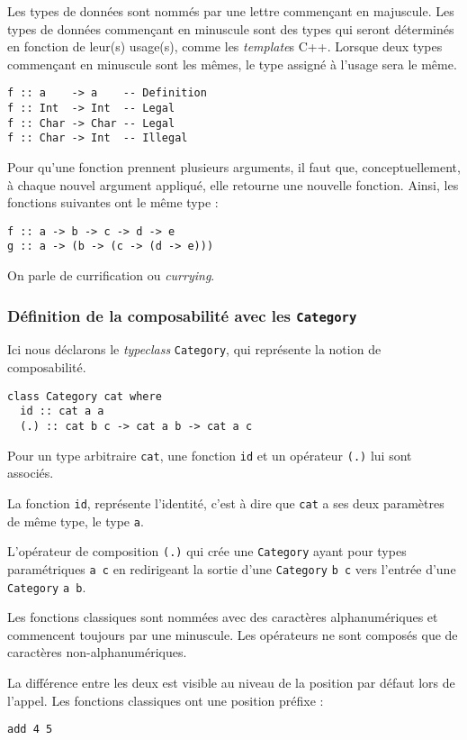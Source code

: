 \documentclass{llncs}
\begin{document}
Les types de données sont nommés par une lettre commençant en majuscule.
Les types de données commençant en minuscule sont des types qui seront déterminés
en fonction de leur(s) usage(s), comme les \emph{template}s C++.
Lorsque deux types commençant en minuscule sont les mêmes, le type assigné à
l'usage sera le même.
\begin{lstlisting}
f :: a    -> a    -- Definition
f :: Int  -> Int  -- Legal
f :: Char -> Char -- Legal
f :: Char -> Int  -- Illegal
\end{lstlisting}

Pour qu'une fonction prennent plusieurs arguments, il faut que, conceptuellement,
à chaque nouvel argument appliqué, elle retourne une nouvelle fonction.
Ainsi, les fonctions suivantes ont le même type :
\begin{lstlisting}
f :: a -> b -> c -> d -> e
g :: a -> (b -> (c -> (d -> e)))
\end{lstlisting}
On parle de currification ou \emph{currying}.

\subsubsection{Définition de la composabilité avec les \lstinline{Category}}
Ici nous déclarons le \emph{typeclass} \lstinline{Category}, qui représente
la notion de composabilité.
\begin{lstlisting}
class Category cat where
  id :: cat a a
  (.) :: cat b c -> cat a b -> cat a c
\end{lstlisting}

Pour un type arbitraire \lstinline{cat}, une fonction \lstinline{id} et un opérateur \lstinline{(.)} lui sont
associés.

La fonction \lstinline{id}, représente l'identité, c'est à dire
que \lstinline{cat} a ses deux paramètres de même type, le type \lstinline{a}.

L'opérateur de composition \lstinline{(.)} qui crée une \lstinline{Category}
ayant pour types paramétriques \lstinline{a c} en redirigeant la sortie d'une
\lstinline{Category} \lstinline{b c} vers l'entrée d'une \lstinline{Category} \lstinline{a b}.

Les fonctions classiques sont nommées avec des caractères alphanumériques et commencent
toujours par une minuscule.
Les opérateurs ne sont composés que de caractères non-alphanumériques.

La différence entre les deux est visible au niveau de la position par défaut lors
de l'appel.
Les fonctions classiques ont une position préfixe :
\begin{lstlisting}
add 4 5
\end{lstlisting}
\end{document}
